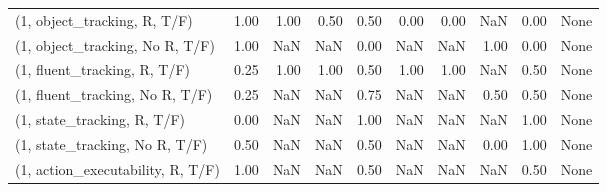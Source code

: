 \begin{table*}[h!]
\begin{adjustbox}{width=2\columnwidth,center}
\begin{tabular}{lrrr|rrr|rrr}
\midrule
(1, object\_tracking, R, T/F)         &                      1.00 &                  1.00 &                      0.50 &                          0.50 &                      0.00 &                          0.00 &                                    NaN &                               0.00 &                                  None \\
(1, object\_tracking, No R, T/F)      &                      1.00 &                   NaN &                       NaN &                          0.00 &                       NaN &                           NaN &                                   1.00 &                               0.00 &                                  None \\
(1, fluent\_tracking, R, T/F)         &                      0.25 &                  1.00 &                      1.00 &                          0.50 &                      1.00 &                          1.00 &                                    NaN &                               0.50 &                                  None \\
(1, fluent\_tracking, No R, T/F)      &                      0.25 &                   NaN &                       NaN &                          0.75 &                       NaN &                           NaN &                                   0.50 &                               0.50 &                                  None \\
(1, state\_tracking, R, T/F)          &                      0.00 &                   NaN &                       NaN &                          1.00 &                       NaN &                           NaN &                                    NaN &                               1.00 &                                  None \\
(1, state\_tracking, No R, T/F)       &                      0.50 &                   NaN &                       NaN &                          0.50 &                       NaN &                           NaN &                                   0.00 &                               1.00 &                                  None \\
(1, action\_executability, R, T/F)    &                      1.00 &                   NaN &                       NaN &                          0.50 &                       NaN &                           NaN &                                    NaN &                               0.50 &                                  None \\

\end{tabular}
\end{adjustbox}
\end{table*}
